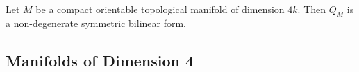 \documentclass[a4paper]{article}
\begin{document}
\begin{prp}{}{}\\
Let $M$ be a compact orientable topological manifold of dimension $4k$. Then $Q_M$ is a non-degenerate symmetric bilinear form. 
\end{prp}

\subsection{Manifolds of Dimension 4}
\end{document}
